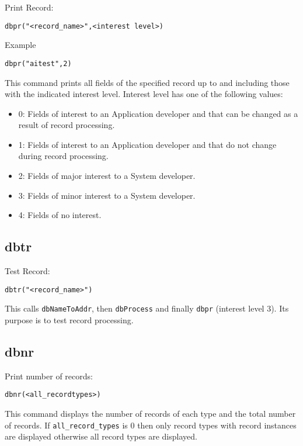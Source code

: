 Print Record:

\begin{verbatim}dbpr("<record_name>",<interest level>)
\end{verbatim}Example

\begin{verbatim}dbpr("aitest",2)
\end{verbatim}This command prints all fields of the specified record up to and including those with the indicated interest level. Interest 
level has one of the following values:

\begin{itemize}\item 0:  Fields of interest to an Application developer and that can be changed as a result of record processing.

\item 1:  Fields of interest to an Application developer and that do not change during record processing.

\item 2: Fields of major interest to a System developer.

\item 3: Fields of minor interest to a System developer.

\item 4: Fields of no interest.

\end{itemize}\subsection{ dbtr}

Test Record:

\begin{verbatim}dbtr("<record_name>")
\end{verbatim}This calls \verb|dbNameToAddr|, then \verb|dbProcess| and finally \verb|dbpr| (interest level 3). Its purpose is to test record processing.

\subsection{dbnr}

Print number of records:

\begin{verbatim}dbnr(<all_recordtypes>)
\end{verbatim}This command displays the number of records of each type and the total number of records. If \verb|all_record_types| is 
0 then only record types with record instances are displayed otherwise all record types are displayed.

